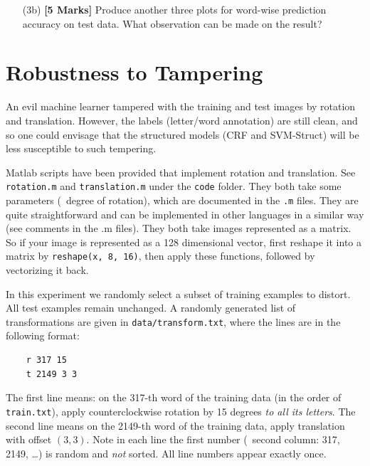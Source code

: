 \documentclass[11pt]{report}
\begin{document}
\begin{itemize}
		\item[(3b)] {\bf [5 Marks]} Produce another three plots for word-wise prediction accuracy on test data.  What observation can be made on the result?
	\end{itemize}
	
	
	\section{Robustness to Tampering}
	
	An evil machine learner tampered with the training and test images by rotation and translation.
	However, the labels (letter/word annotation) are still clean, and so
	one could envisage that the structured models (CRF and SVM-Struct) will be less susceptible to such tempering.
	
	
	Matlab scripts have been provided that implement rotation and translation.
	See \verb#rotation.m# and \verb#translation.m# under the \verb#code# folder.
	They both take some parameters (\eg\ degree of rotation), which are documented in the \verb#.m# files.
	They are quite straightforward and can be implemented in other languages in a similar way (see comments in the .m files).
	They both take images represented as a matrix.
	So if your image is represented as a 128 dimensional vector,
	first reshape it into a matrix by \verb#reshape(x, 8, 16)#,
	then apply these functions,
	followed by vectorizing it back.
	
	
	In this experiment
	we randomly select a subset of training examples to distort.
	All test examples remain unchanged.
	A randomly generated list of transformations are given in \verb#data/transform.txt#, where the lines are in the following format:
	\begin{verbatim}
	r 317 15
	t 2149 3 3
	\end{verbatim}
	The first line means: on the 317-th word of the training data (in the order of \verb#train.txt#),
	apply counterclockwise rotation by 15 degrees \emph{to all its letters}.
	The second line means on the 2149-th word of the training data, apply translation with offset $(3,3)$.
	Note in each line the first number (\ie\ second column: 317, 2149, \ldots) is random and \emph{not} sorted.
	All line numbers appear exactly once.
	
\end{document}
